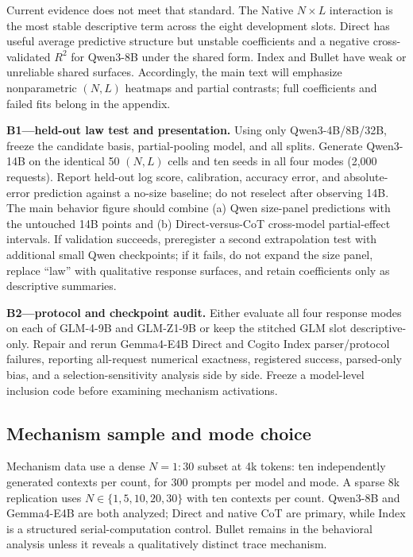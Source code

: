 Current evidence does not meet that standard. The Native \(N\times L\) interaction is the most stable descriptive term across the eight development slots. Direct has useful average predictive structure but unstable coefficients and a negative cross-validated \(R^2\) for Qwen3-8B under the shared form. Index and Bullet have weak or unreliable shared surfaces. Accordingly, the main text will emphasize nonparametric \((N,L)\) heatmaps and partial contrasts; full coefficients and failed fits belong in the appendix.

\begin{todobox}
\textbf{B1---held-out law test and presentation.}
Using only Qwen3-4B/8B/32B, freeze the candidate basis, partial-pooling model, and all splits. Generate Qwen3-14B on the identical 50 \((N,L)\) cells and ten seeds in all four modes (2,000 requests). Report held-out log score, calibration, accuracy error, and absolute-error prediction against a no-size baseline; do not reselect after observing 14B. The main behavior figure should combine (a) Qwen size-panel predictions with the untouched 14B points and (b) Direct-versus-CoT cross-model partial-effect intervals. If validation succeeds, preregister a second extrapolation test with additional small Qwen checkpoints; if it fails, do not expand the size panel, replace ``law'' with qualitative response surfaces, and retain coefficients only as descriptive summaries.
\end{todobox}

\begin{todobox}
\textbf{B2---protocol and checkpoint audit.}
Either evaluate all four response modes on each of GLM-4-9B and GLM-Z1-9B or keep the stitched GLM slot descriptive-only. Repair and rerun Gemma4-E4B Direct and Cogito Index parser/protocol failures, reporting all-request numerical exactness, registered success, parsed-only bias, and a selection-sensitivity analysis side by side. Freeze a model-level inclusion code before examining mechanism activations.
\end{todobox}

\subsection{Mechanism sample and mode choice}

Mechanism data use a dense \(N=1{:}30\) subset at 4k tokens: ten independently generated contexts per count, for 300 prompts per model and mode. A sparse 8k replication uses \(N\in\{1,5,10,20,30\}\) with ten contexts per count. Qwen3-8B and Gemma4-E4B are both analyzed; Direct and native CoT are primary, while Index is a structured serial-computation control. Bullet remains in the behavioral analysis unless it reveals a qualitatively distinct trace mechanism.

